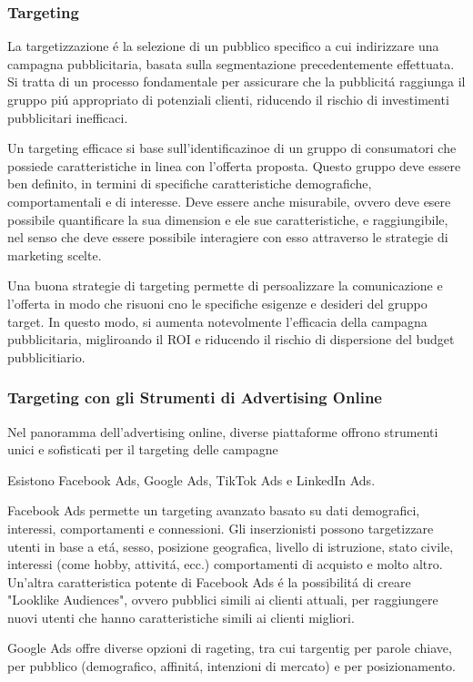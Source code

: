 \documentclass{article}
\begin{document}
\subsubsection{Targeting}
La targetizzazione \'e la selezione di un pubblico specifico a cui indirizzare una campagna pubblicitaria, basata sulla segmentazione precedentemente effettuata. Si tratta di un processo fondamentale per assicurare che la pubblicit\'a raggiunga il gruppo pi\'u appropriato di potenziali clienti, riducendo il rischio di investimenti pubblicitari inefficaci. 

Un targeting efficace si base sull'identificazinoe di un gruppo di consumatori che possiede caratteristiche in linea con l'offerta proposta. Questo gruppo deve essere ben definito, in termini di specifiche caratteristiche demografiche, comportamentali e di interesse. Deve essere anche misurabile, ovvero deve esere possibile quantificare la sua dimension e ele sue caratteristiche, e raggiungibile, nel senso che deve essere possibile interagiere con esso attraverso le strategie di marketing scelte.

Una buona strategie di targeting permette di persoalizzare la comunicazione e l'offerta in modo che risuoni cno le specifiche esigenze e desideri del gruppo target. In questo modo, si aumenta notevolmente l'efficacia della campagna pubblicitaria, migliroando il ROI e riducendo il rischio di dispersione del budget pubblicitiario.

\subsubsection{Targeting con gli Strumenti di Advertising Online}
Nel panoramma dell'advertising online, diverse piattaforme offrono strumenti unici e sofisticati per il targeting delle campagne

Esistono Facebook Ads, Google Ads, TikTok Ads e LinkedIn Ads.

Facebook Ads permette un targeting avanzato basato su dati demografici, interessi, comportamenti e connessioni. Gli inserzionisti possono targetizzare utenti in base a et\'a, sesso, posizione geografica, livello di istruzione, stato civile, interessi (come hobby, attivit\'a, ecc.) comportamenti di acquisto e molto altro. Un'altra caratteristica potente di Facebook Ads \'e la possibilit\'a di creare "Looklike Audiences", ovvero pubblici simili ai clienti attuali, per raggiungere nuovi utenti che hanno caratteristiche simili ai clienti migliori.

Google Ads offre diverse opzioni di rageting, tra cui targentig per parole chiave, per pubblico (demografico, affinit\'a, intenzioni di mercato) e per posizionamento. 
\end{document}
